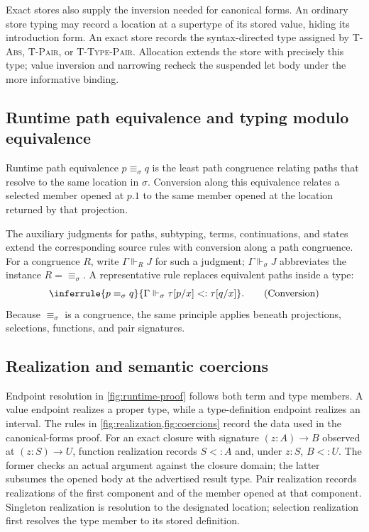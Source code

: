 \documentclass[acmsmall,screen,nonacm]{acmart}
\newcommand{\subst}[3]{#1[#2/#3]}
\newcommand{\runtimeeq}{\mathrel{\equiv_{\sigma}}}
\newcommand{\struct}{\Vdash}
\begin{document}
Exact stores also supply the inversion needed for canonical forms. An
ordinary store typing may record a location at a supertype of its stored
value, hiding its introduction form. An exact store records the
syntax-directed type assigned by
\textsc{T-Abs}, \textsc{T-Pair}, or \textsc{T-Type-Pair}. Allocation extends
the store with precisely this type; value inversion and narrowing recheck the
suspended let body under the more informative binding.

\subsection{Runtime path equivalence and typing modulo equivalence}

Runtime path equivalence \(p\runtimeeq q\) is the least path congruence
relating paths that resolve to the same location in \(\sigma\). Conversion
along this equivalence relates a selected member opened at \(p.1\) to the same
member opened at the location returned by that projection.

The auxiliary judgments for paths, subtyping, terms, continuations, and states
extend the corresponding source rules with conversion along a path
congruence. For a congruence \(R\), write \(\Gamma\struct_R J\) for such a
judgment; \(\Gamma\struct_{\sigma}J\) abbreviates the instance
\(R=\runtimeeq\). A representative rule replaces equivalent paths inside a
type:
\[
\inferrule
  {p\runtimeeq q}
  {\Gamma\struct_{\sigma}
    \subst{\tau}{p}{x}<:\subst{\tau}{q}{x}}.
\tag{Conversion}
\]
Because \(\runtimeeq\) is a congruence, the same principle applies beneath
projections, selections, functions, and pair signatures.

\subsection{Realization and semantic coercions}
\label{sec:realization}

Endpoint resolution in \cref{fig:runtime-proof} follows both term and type
members. A value endpoint realizes a proper type, while a type-definition
endpoint realizes an interval. The rules in
\cref{fig:realization,fig:coercions} record the data used in the
canonical-forms proof. For
an exact closure with signature \((z:A)\to B\) observed at
\((z:S)\to U\), function realization records \(S<:A\) and, under \(z:S\),
\(B<:U\). The former checks an actual argument against the closure domain;
the latter subsumes the opened body at the advertised result type. Pair
realization records realizations of the first component and of the member
opened at that component. Singleton realization is resolution to the
designated location; selection realization first resolves the type member to
its stored definition.
\end{document}
